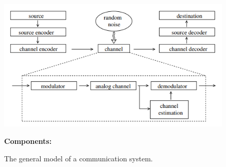 \documentclass[12pt, oneside]{book}
\begin{document}
\begin{figure}[h!]
	\centering
	\includegraphics[width=\linewidth]{./1.1.png}
	\caption{The general model of a communication system.}
	\label{fig:1.1}
	\textbf{Components:}
\end{figure}
\\
\end{document}
